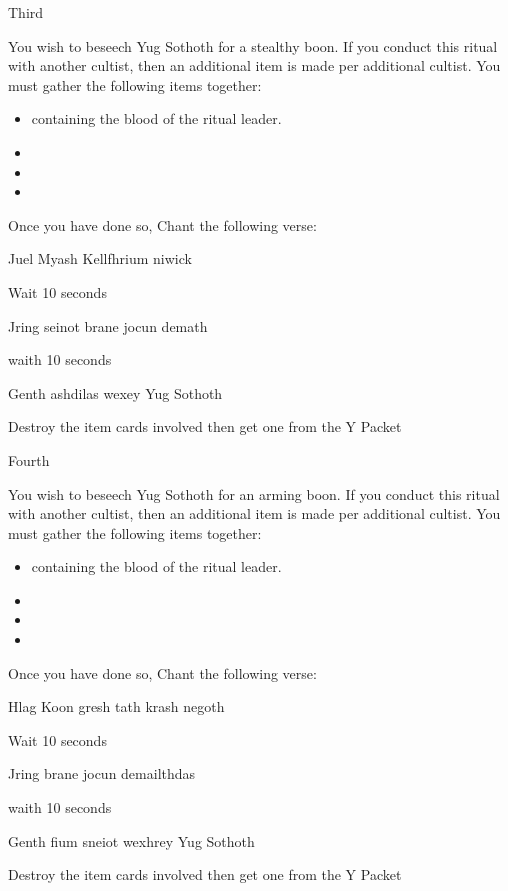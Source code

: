 \documentclass[greennotebook]{guildcamp4} %
\begin{document}
\begin{page}{Third}
	
		You wish to beseech Yug Sothoth for a stealthy boon. If you conduct this ritual with another cultist, then an additional item is made per additional cultist. You must gather the following items together: 
		
		\begin{itemize}
			\item \iTestTube{} containing the blood of the ritual leader.
			\item \iGlassLens{}
			\item \iCauldron{}
			\item \iChemicalV{}
		\end{itemize}		
		
		Once you have done so, Chant the following verse:
		
		Juel Myash Kellfhrium niwick
		
		Wait 10 seconds
		
		Jring seinot brane jocun demath
		
		waith 10 seconds
		
		Genth ashdilas wexey Yug Sothoth
		
		Destroy the item cards involved then get one \iInvisibilityCloak{} from the Y Packet
	
\end{page}

\begin{page}{Fourth}
	
		You wish to beseech Yug Sothoth for an arming boon. If you conduct this ritual with another cultist, then an additional item is made per additional cultist. You must gather the following items together: 
		
		\begin{itemize}
			\item \iTestTube{} containing the blood of the ritual leader.
			\item \iMultitool{}
			\item \iScrapMetal{}
			\item \iWrench{}
		\end{itemize}		
		
		Once you have done so, Chant the following verse:
		
		Hlag Koon gresh tath krash negoth
		
		Wait 10 seconds
		
		Jring  brane jocun demailthdas
		
		waith 10 seconds
		
		Genth fium sneiot wexhrey Yug Sothoth
		
		Destroy the item cards involved then get one \iCRUpPotion{} from the Y Packet

	
\end{page}
\end{document}
